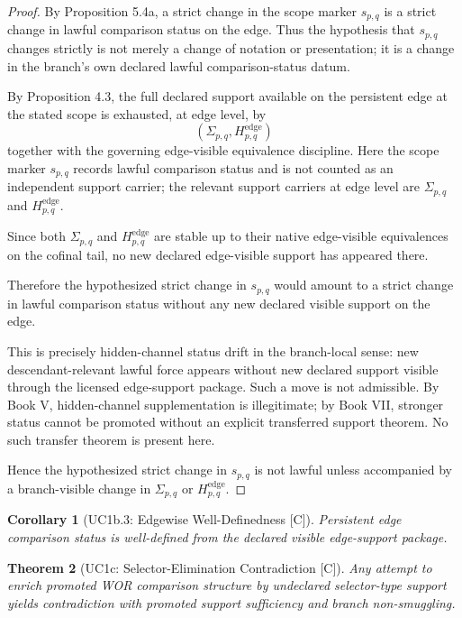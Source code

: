 \documentclass[11pt]{article}
\newtheorem{theorem}{Theorem}[section]
\newtheorem{corollary}[theorem]{Corollary}
\theoremstyle{definition}
\theoremstyle{remark}
\newcommand{\C}{\textnormal{[C]}}
\newcommand{\Sigmaedge}{\Sigma_{p,q}}
\newcommand{\Hedge}{H^{\mathrm{edge}}_{p,q}}
\newcommand{\scopepq}{s_{p,q}}
\begin{document}
\begin{proof}
By Proposition 5.4a, a strict change in the scope marker \(\scopepq\) is a strict change in lawful comparison status on the edge. Thus the hypothesis that \(\scopepq\) changes strictly is not merely a change of notation or presentation; it is a change in the branch’s own declared lawful comparison-status datum.

By Proposition 4.3, the full declared support available on the persistent edge at the stated scope is exhausted, at edge level, by
\[
(\Sigmaedge,\Hedge)
\]
together with the governing edge-visible equivalence discipline. Here the scope marker \(\scopepq\) records lawful comparison status and is not counted as an independent support carrier; the relevant support carriers at edge level are \(\Sigmaedge\) and \(\Hedge\).

Since both \(\Sigmaedge\) and \(\Hedge\) are stable up to their native edge-visible equivalences on the cofinal tail, no new declared edge-visible support has appeared there.

Therefore the hypothesized strict change in \(\scopepq\) would amount to a strict change in lawful comparison status without any new declared visible support on the edge.

This is precisely hidden-channel status drift in the branch-local sense: new descendant-relevant lawful force appears without new declared support visible through the licensed edge-support package. Such a move is not admissible. By Book V, hidden-channel supplementation is illegitimate; by Book VII, stronger status cannot be promoted without an explicit transferred support theorem. No such transfer theorem is present here.

Hence the hypothesized strict change in \(\scopepq\) is not lawful unless accompanied by a branch-visible change in \(\Sigmaedge\) or \(\Hedge\). \qedhere
\end{proof}

\begin{corollary}[UC1b.3: Edgewise Well-Definedness {\C}]
Persistent edge comparison status is well-defined from the declared visible edge-support package.
\end{corollary}

\begin{theorem}[UC1c: Selector-Elimination Contradiction {\C}]
Any attempt to enrich promoted WOR comparison structure by undeclared selector-type support yields contradiction with promoted support sufficiency and branch non-smuggling.
\end{theorem}
\end{document}
